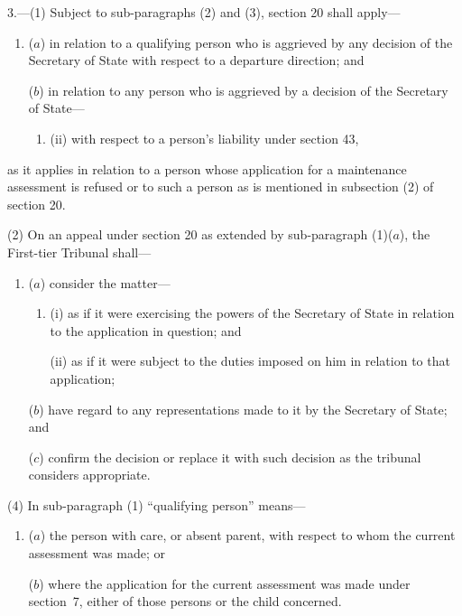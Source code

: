 \documentclass[12pt,a4paper]{article}
\begin{document}
3.---(1) Subject to sub-paragraphs (2) and (3), section 20 shall apply—
\begin{enumerate}\item[]
($a$) in relation to a qualifying person who is aggrieved by any decision of the Secretary of State with respect to a departure direction; and

($b$) in relation to any person who is aggrieved by a decision of the Secretary of State—
\begin{enumerate}\item[]

(ii) with respect to a person’s liability under section 43,
\end{enumerate}
\end{enumerate}
as it applies in relation to a person whose application for a maintenance assessment is refused or to such a person as is mentioned in subsection (2) of section 20.

(2) On an appeal under section 20 as extended by sub-paragraph (1)($a$), 
the First-tier Tribunal  %
shall—
\begin{enumerate}\item[]
($a$) consider the matter—
\begin{enumerate}\item[]
(i) as if it were exercising the powers of the Secretary of State in relation to the application in question; and

(ii) as if it were subject to the duties imposed on him in relation to that application;
\end{enumerate}

($b$) have regard to any representations made to it by the Secretary of State; and

($c$) confirm the decision or replace it with such decision as the tribunal considers appropriate.
\end{enumerate}


(4) In sub-paragraph (1) “qualifying person” means—
\begin{enumerate}\item[]
($a$) the person with care, or absent parent, with respect to whom the current assessment was made; or

($b$) where the application for the current assessment was made under section~7, either of those persons or the child concerned.
\end{enumerate}
\end{document}
